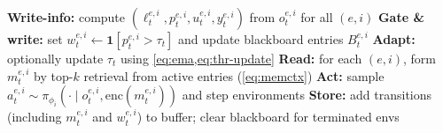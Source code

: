 \documentclass{article}
\theoremstyle{plain}
\theoremstyle{definition}
\theoremstyle{remark}
\begin{document}
\begin{algorithm}[h!]
\caption{\textsc{Co2PO}: one rollout step at timestep $t$ (for all envs $e$ and agents $i$).}
\label{alg:co2po}
\begin{algorithmic}[1]
\STATE \textbf{Write-info:} compute $(\ell_t^{e,i},p_t^{e,i},u_t^{e,i},y_t^{e,i})$ from $o_t^{e,i}$ for all $(e,i)$
\STATE \textbf{Gate \& write:} set $w_t^{e,i} \leftarrow \mathbf{1}[p_t^{e,i}>\tau_t]$ and update blackboard entries $B_t^{e,i}$
\STATE \textbf{Adapt:} optionally update $\tau_t$ using \cref{eq:ema,eq:thr-update}
\STATE \textbf{Read:} for each $(e,i)$, form $m_t^{e,i}$ by top-$k$ retrieval from active entries (\cref{eq:memctx})
\STATE \textbf{Act:} sample $a_t^{e,i}\sim \pi_{\phi_i}(\cdot\mid o_t^{e,i}, \mathrm{enc}(m_t^{e,i}))$ and step environments
\STATE \textbf{Store:} add transitions (including $m_t^{e,i}$ and $w_t^{e,i}$) to buffer; clear blackboard for terminated envs
\end{algorithmic}
\end{algorithm}





\end{document}
